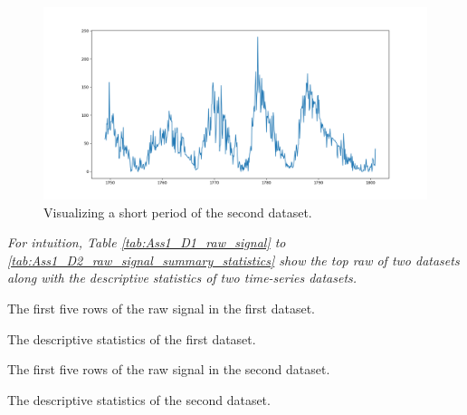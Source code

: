 \begin{figure}[H]
    \centering
    \begin{minipage}[b]{1\textwidth}
        \includegraphics[width=\textwidth]{figures/Ass1/Ass1_D2_raw_signal_1990.png}
    \end{minipage}
    \caption{Visualizing a short period of the second dataset.}
    \label{fig:Ass1_D2_raw_signal_1990}
\end{figure}

\textit{For intuition, Table \ref{tab:Ass1_D1_raw_signal} to  \ref{tab:Ass1_D2_raw_signal_summary_statistics} show the top raw of two datasets along with the descriptive statistics of two time-series datasets.}


\begin{table}[H]
 \centering
\caption{The first five rows of the raw signal in the first dataset.}
\label{tab:Ass1_D1_raw_signal}

\end{table}

\begin{table}[H]
 \centering
\caption{The descriptive statistics of the first dataset.}
\label{tab:Ass1_D1_raw_signal_summary_statistics}

\end{table}

\begin{table}[H]
 \centering
\caption{The first five rows of the raw signal in the second dataset.}
\label{tab:Ass1_D2_raw_signal}

\end{table}

\begin{table}[H]
 \centering
\caption{The descriptive statistics of the second dataset.} \label{tab:Ass1_D2_raw_signal_summary_statistics}

\end{table}






